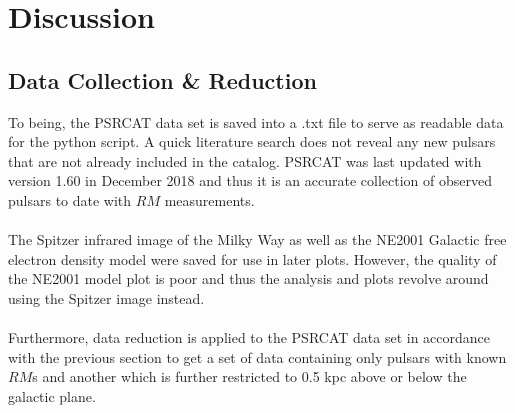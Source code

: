 \documentclass[12pt]{article}
\begin{document}
\section{Discussion}

\subsection{Data Collection \& Reduction}
	To being, the PSRCAT data set is saved into a .txt file to serve as readable data for the python script. A quick literature search does not reveal any new pulsars that are not already included in the catalog. PSRCAT was last updated with version 1.60 in December 2018 and thus it is an accurate collection of observed pulsars to date with $RM$ measurements. 
	\\
	\\
	The Spitzer infrared image of the Milky Way as well as the NE2001 Galactic free electron density model were saved for use in later plots. However, the quality of the NE2001 model plot is poor and thus the analysis and plots revolve around using the Spitzer image instead.
	\\
	\\
	Furthermore, data reduction is applied to the PSRCAT data set in accordance with the previous section to get a set of data containing only pulsars with known $RM$s and another which is further restricted to 0.5 kpc above or below the galactic plane.
\end{document}
